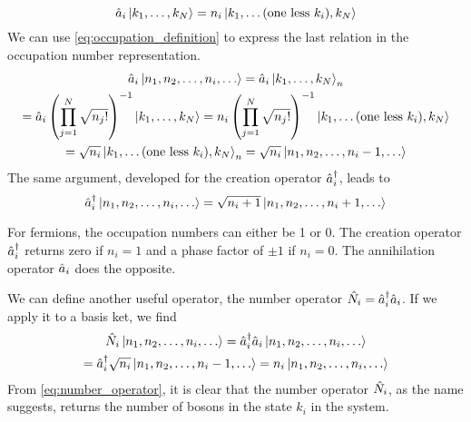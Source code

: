 \begin{equation}
    \hat{a}_i \ket{k_1, \dots, k_N} = n_i \ket{k_1, \dots (\text{one less }k_i), k_N}
\end{equation}
We can use \cref{eq:occupation_definition} to express the last relation in the occupation number representation.
\begin{multline}
    \hat{a}_i \ket{n_1, n_2, \dots, n_i, \dots} =
    \hat{a}_i \ket{k_1, \dots, k_N}_n
    \\ = \hat{a}_i \left( \prod_{j=1}^N \sqrt{n_j!} \right)^{-1} \ket{k_1, \dots, k_N}
    = n_i \left( \prod_{j=1}^N \sqrt{n_j!} \right)^{-1} \ket{k_1, \dots (\text{one less }k_i), k_N}
    \\ = \sqrt{n_i} \ket{k_1, \dots (\text{one less }k_i), k_N}_n = \sqrt{n_i} \ket{n_1, n_2, \dots, n_i-1, \dots}
\end{multline}
The same argument, developed for the creation operator $\hat{a}_i^\dagger$, leads to
\begin{equation}
    \hat{a}_i^\dagger \ket{n_1, n_2, \dots, n_i, \dots} = \sqrt{n_i+1} \ket{n_1, n_2, \dots, n_i+1, \dots}
\end{equation}


For fermions, the occupation numbers can either be 1 or 0. The creation operator $\hat{a}_i^\dagger$ returns zero if $n_i=1$ and a phase factor of $\pm 1$ if $n_i=0$. The annihilation operator $\hat{a}_i$ does the opposite.

We can define another useful operator, the number operator $\hat{N}_i = \hat{a}_i^\dagger\hat{a}_i$. If we apply it to a basis ket, we find
\begin{multline} \label{eq:number_operator}
    \hat{N}_i \ket{n_1, n_2, \dots, n_i, \dots}
    = \hat{a}_i^\dagger\hat{a}_i \ket{n_1, n_2, \dots, n_i, \dots}
    \\ = \hat{a}_i^\dagger \sqrt{n_i} \ket{n_1, n_2, \dots, n_i-1, \dots}
    = n_i \ket{n_1, n_2, \dots, n_i, \dots}
\end{multline}
From \cref{eq:number_operator}, it is clear that the number operator $\hat{N}_i$, as the name suggests, returns the number of bosons in the state $k_i$ in the system.

